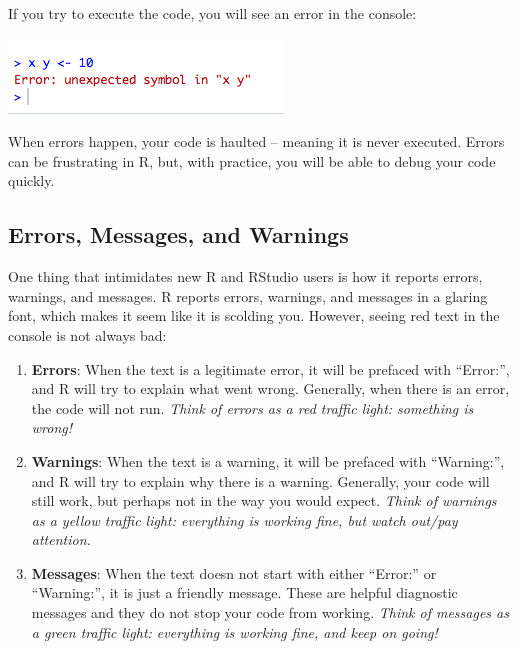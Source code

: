 \documentclass[
]{book}
\begin{document}
If you try to execute the code, you will see an error in the console:

\begin{center}\includegraphics[width=0.7\linewidth]{img/error} \end{center}

When errors happen, your code is haulted -- meaning it is never executed. Errors can be frustrating in R, but, with practice, you will be able to debug your code quickly.

\hypertarget{errors-messages-and-warnings}{%
\subsection{Errors, Messages, and Warnings}\label{errors-messages-and-warnings}}

One thing that intimidates new R and RStudio users is how it reports errors, warnings, and messages. R reports errors, warnings, and messages in a glaring font, which makes it seem like it is scolding you. However, seeing red text in the console is not always bad:

\begin{enumerate}
\def\labelenumi{\arabic{enumi}.}
\item
  \textbf{Errors}: When the text is a legitimate error, it will be prefaced with ``Error:'', and R will try to explain what went wrong. Generally, when there is an error, the code will not run. \emph{Think of errors as a red traffic light: something is wrong!}
\item
  \textbf{Warnings}: When the text is a warning, it will be prefaced with ``Warning:'', and R will try to explain why there is a warning. Generally, your code will still work, but perhaps not in the way you would expect. \emph{Think of warnings as a yellow traffic light: everything is working fine, but watch out/pay attention.}
\item
  \textbf{Messages}: When the text doesn not start with either ``Error:'' or ``Warning:'', it is just a friendly message. These are helpful diagnostic messages and they do not stop your code from working. \emph{Think of messages as a green traffic light: everything is working fine, and keep on going!}
\end{enumerate}
\end{document}
